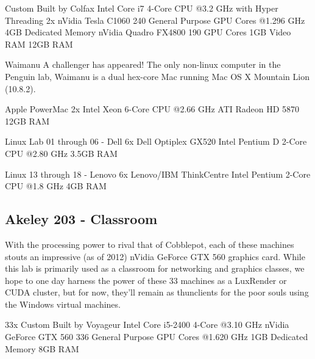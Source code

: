     Custom Built by Colfax
    Intel Core i7 4-Core CPU @3.2 GHz with Hyper Threading
    2x  nVidia Tesla C1060
        240 General Purpose GPU Cores @1.296 GHz
        4GB Dedicated Memory
    nVidia Quadro FX4800
        190 GPU Cores
        1GB Video RAM
    12GB RAM
        
Waimanu
    A challenger has appeared!  The only non-linux computer in the Penguin lab, Waimanu is a dual hex-core Mac running Mac OS X Mountain Lion (10.8.2).

    Apple PowerMac
    2x  Intel Xeon 6-Core CPU @2.66 GHz
    ATI Radeon HD 5870
    12GB RAM

Linux Lab 01 through 06 - Dell
    6x  Dell Optiplex GX520
    Intel Pentium D 2-Core CPU @2.80 GHz
    3.5GB RAM

Linux 13 through 18 - Lenovo
    6x  Lenovo/IBM ThinkCentre
    Intel Pentium 2-Core CPU @1.8 GHz
    4GB RAM

\subsection*{Akeley 203 - Classroom}
    With the processing power to rival that of Cobblepot, each of these machines stouts an impressive (as of 2012) nVidia GeForce GTX 560 graphics card.  While this lab is primarily used as a classroom for networking and graphics classes, we hope to one day harness the power of these 33 machines as a LuxRender or CUDA cluster, but for now, they'll remain as thunclients for the poor souls using the Windows virtual machines.

    33x Custom Built by Voyageur
    Intel Core i5-2400 4-Core @3.10 GHz
    nVidia GeForce GTX 560
        336 General Purpose GPU Cores @1.620 GHz
        1GB Dedicated Memory
    8GB RAM
